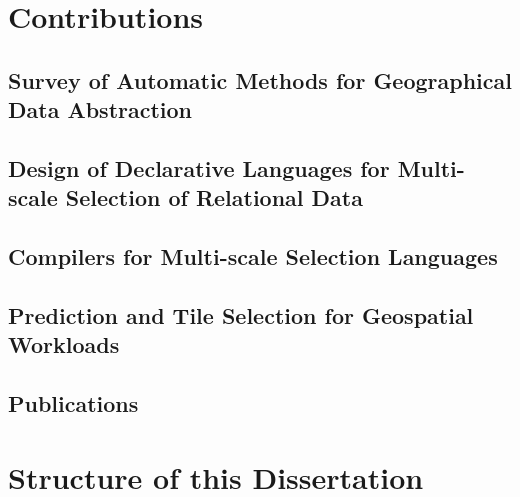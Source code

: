 
\section{Contributions}
\subsection{Survey of Automatic Methods for Geographical Data Abstraction}
\subsection{Design of Declarative Languages for Multi-scale Selection of Relational Data}
\subsection{Compilers for Multi-scale Selection Languages}
\subsection{Prediction and Tile Selection for Geospatial Workloads}
\subsection{Publications}

\section{Structure of this Dissertation}
